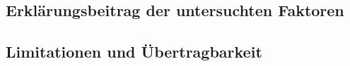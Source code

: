 \documentclass[12pt,a4paper]{article}
\begin{document}
\subsection{Erklärungsbeitrag der untersuchten Faktoren}

\subsection{Limitationen und Übertragbarkeit}
%
\end{document}

